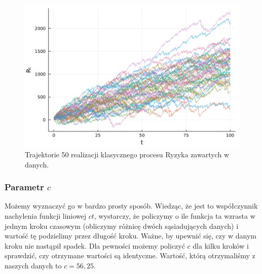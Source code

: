\documentclass[12pt]{mwart}
\begin{document}
	\begin{figure}[H]
		\centering
		\includegraphics[scale=0.1]{fig/trajektorie.png}
		\caption{Trajektorie 50 realizacji klasycznego procesu Ryzyka zawartych w danych.}
	\end{figure}
	
	\subsubsection{Parametr {\boldmath $c$}}
	\noindent Możemy wyznaczyć go w bardzo prosty sposób. Wiedząc, że jest to współczynnik nachylenia funkcji liniowej $ct$, wystarczy, że policzymy o ile funkcja ta wzrasta w jednym kroku czasowym (obliczymy różnicę dwóch sąsiadujących danych) i wartość tę podzielimy przez długość kroku. Ważne, by upewnić się, czy w danym kroku nie nastąpił spadek. Dla pewności możemy policzyć $c$ dla kilku kroków i sprawdzić, czy otrzymane wartości są identyczne. Wartość, którą otrzymaliśmy z naszych danych to $c = 56,25$.
	
\end{document}
